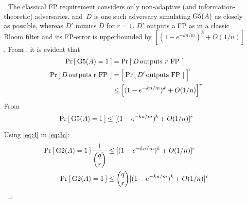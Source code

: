 \begin{proof}[]
The classical FP requirement considers only non-adaptive (and information-theoretic) adversaries, and~$D$ is one such adversary simulating $\text{G5}(A)$ as closely as possible, whereas $D'$ mimics $D$ for $r=1$. $D'$ outputs a FP as in a classic Bloom filter and its FP-error is upperbounded by $[(1-e^{-kn/m})^k +O(1/n)]$ \cite{KirschMitzenmacher}.  %
\noindent
From , it is evident that 
\begin{align}
\Pr\left[\: \text{G5}(A)=1 \:\right] &= \Pr\left[\: D \, \mbox{outputs $r$ FP} \, \:\right]\label{eq:4a}\\
\nonumber \Pr\left[\: D \, \mbox{outputs r FP} \, \:\right] &=  \Big[\Pr\left[\: D' \, \mbox{outputs FP} \, \:\right]\Big]^r\\
& \leq \Big[(1-e^{-kn/m})^k +O(1/n)\Big]^r \label{eq:4b}
\end{align}
\noindent
From 
\begin{equation}
\Pr\left[\: \text{G5}(A)=1 \:\right] \leq [(1-e^{-kn/m})^k + O(1/n)]^r \label{eq:4}
\end{equation}

\noindent
Using \ref{eq:4} in \ref{eq:3c}:
\begin{align}
\nonumber \Pr\left[\: \text{G2}(A)=1 \:\right]\frac{1}{\dbinom{q}{r}}  &\leq [(1-e^{-kn/m})^k +O(1/n)]^r\\
 \Pr\left[\: \text{G2}(A)=1 \:\right]  & \leq \dbinom{q}{r}[(1-e^{-kn/m})^k +O(1/n)]^r\label{eq:5}
\end{align}


\end{proof}
